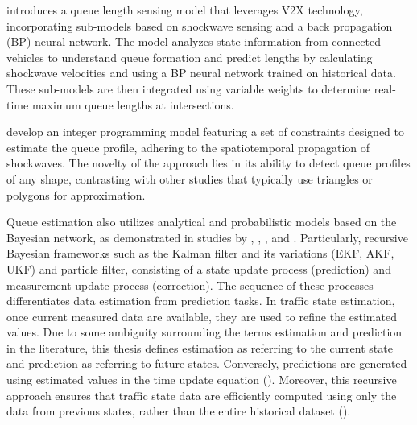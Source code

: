 \textcite{gao2019connected} introduces a queue length sensing model that leverages V2X technology, incorporating sub-models based on shockwave sensing and a back propagation (BP) neural network. The model analyzes state information from connected vehicles to understand queue formation and predict lengths by calculating shockwave velocities and using a BP neural network trained on historical data. These sub-models are then integrated using variable weights to determine real-time maximum queue lengths at intersections.

\textcite{wang2020queue} develop an integer programming model featuring a set of constraints designed to estimate the queue profile, adhering to the spatiotemporal propagation of shockwaves. The novelty of the approach lies in its ability to detect queue profiles of any shape, contrasting with other studies that typically use triangles or polygons for approximation.

Queue estimation also utilizes analytical and probabilistic models based on the Bayesian network, as demonstrated in studies by \textcite{hao2014cycle}, \textcite{comert2021queue}, \textcite{comert2013simple}, and \textcite{tan2020fuzing}.  Particularly, recursive Bayesian frameworks such as the Kalman filter and its variations (EKF, AKF, UKF) and particle filter, consisting of a state update process (prediction) and measurement update process (correction). The sequence of these processes differentiates data estimation from prediction tasks. In traffic state estimation, once current measured data are available, they are used to refine the estimated values. Due to some ambiguity surrounding the terms estimation and prediction in the literature, this thesis defines estimation as referring to the current state and prediction as referring to future states. Conversely, predictions are generated using estimated values in the time update equation (\textcite{chen2011real}). Moreover, this recursive approach ensures that traffic state data are efficiently computed using only the data from previous states, rather than the entire historical dataset (\textcite{ristic2003beyond}).

